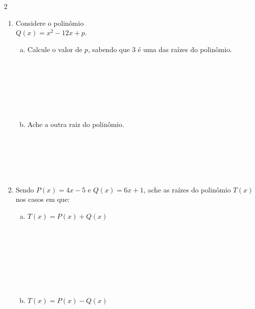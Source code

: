 \documentclass[a4paper,14pt]{article}
\begin{document}
\begin{multicols}{2}
\begin{enumerate}
\begin{enumerate}[a)]
    			\item $C(x) = 4x^2 - 36$ \\\\\\\\\\\\
    			\item $C(x) = (5x - 7)(7x - 5)$\\\\\\\\\\\\
    		\end{enumerate}
    		\item Considere o polinômio \\$Q(x) = x^2 -12x + p$.
    		\begin{enumerate}[a)]
    			\item Calcule o valor de $p$, sabendo que 3 é uma das raízes do polinômio. \\\\\\\\\\\\\\
    			\item Ache a outra raiz do polinômio. \\\\\\\\\\\\
    		\end{enumerate}
    		\item Sendo $P(x) = 4x - 5$ e $Q(x) = 6x + 1$, ache as raízes do polinômio $T(x)$ nos casos em que:
    		\begin{enumerate}[a)]
    			\item $T(x) = P(x) + Q(x)$ \\\\\\\\\\\\\\\\
    			\item $T(x) = P(x) - Q(x)$ \\\\\\\\\\\\\\\\

\end{enumerate}
\end{enumerate}
\end{multicols}
\end{document}
